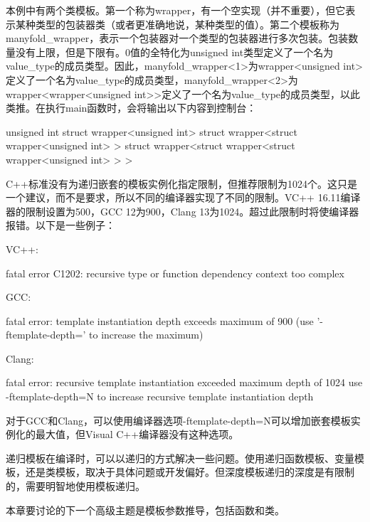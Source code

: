 本例中有两个类模板。第一个称为wrapper，有一个空实现（并不重要），但它表示某种类型的包装器类（或者更准确地说，某种类型的值）。第二个模板称为manyfold_wrapper，表示一个包装器对一个类型的包装器进行多次包装。包装数量没有上限，但是下限有。0值的全特化为unsigned int类型定义了一个名为value_type的成员类型。因此，manyfold_wrapper<1>为wrapper<unsigned int>定义了一个名为value_type的成员类型，manyfold_wrapper<2>为wrapper<wrapper<unsigned int>>定义了一个名为value_type的成员类型，以此类推。在执行main函数时，会将输出以下内容到控制台：

\begin{cppcode}
unsigned int
struct wrapper<unsigned int>
struct wrapper<struct wrapper<unsigned int> >
struct wrapper<struct wrapper<struct wrapper<unsigned int> > >
\end{cppcode}

C++标准没有为递归嵌套的模板实例化指定限制，但推荐限制为1024个。这只是一个建议，而不是要求，所以不同的编译器实现了不同的限制。VC++ 16.11编译器的限制设置为500，GCC 12为900，Clang 13为1024。超过此限制时将使编译器报错。以下是一些例子：

VC++:

\begin{shell}
fatal error C1202: recursive type or function dependency
context too complex
\end{shell}

GCC:

\begin{shell}
fatal error: template instantiation depth exceeds maximum of
900 (use '-ftemplate-depth=' to increase the maximum)
\end{shell}

Clang:

\begin{shell}
fatal error: recursive template instantiation exceeded maximum
depth of 1024
use -ftemplate-depth=N to increase recursive template
instantiation depth
\end{shell}

对于GCC和Clang，可以使用编译器选项-ftemplate-depth=N可以增加嵌套模板实例化的最大值，但Visual C++编译器没有这种选项。

递归模板在编译时，可以以递归的方式解决一些问题。使用递归函数模板、变量模板，还是类模板，取决于具体问题或开发偏好。但深度模板递归的深度是有限制的，需要明智地使用模板递归。

本章要讨论的下一个高级主题是模板参数推导，包括函数和类。





